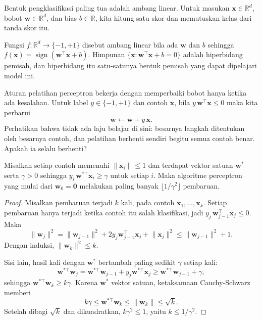 Bentuk pengklasifikasi paling tua adalah ambang linear. Untuk masukan
$\mathbf{x}\in\mathbb{R}^{d}$, bobot $\mathbf{w}\in\mathbb{R}^{d}$, dan bias
$b\in\mathbb{R}$, kita hitung satu skor dan memutuskan kelas dari tanda skor itu.


\begin{definisi}
Fungsi $f:\mathbb{R}^{d}\to\{-1,+1\}$ disebut ambang linear bila ada $\mathbf{w}$ dan $b$
sehingga $f(\mathbf{x})=\operatorname{sign}(\mathbf{w}^{\top}\mathbf{x}+b)$. Himpunan
$\{\mathbf{x}:\mathbf{w}^{\top}\mathbf{x}+b=0\}$ adalah hiperbidang pemisah, dan hiperbidang
itu satu-satunya bentuk pemisah yang dapat dipelajari model ini.
\end{definisi}

Aturan pelatihan perceptron bekerja dengan memperbaiki bobot hanya ketika ada kesalahan.
Untuk label $y\in\{-1,+1\}$ dan contoh $\mathbf{x}$, bila
$y\,\mathbf{w}^{\top}\mathbf{x}\le 0$ maka kita perbarui
\[
  \mathbf{w}\leftarrow\mathbf{w}+y\,\mathbf{x}.
\]
Perhatikan bahwa tidak ada laju belajar di sini: besarnya langkah ditentukan oleh besarnya
contoh, dan pelatihan berhenti sendiri begitu semua contoh benar. Apakah ia selalu berhenti?

\begin{teorema}
Misalkan setiap contoh memenuhi $\lVert\mathbf{x}_{i}\rVert\le1$ dan terdapat vektor satuan
$\mathbf{w}^{*}$ serta $\gamma>0$ sehingga $y_{i}\,\mathbf{w}^{*\top}\mathbf{x}_{i}\ge\gamma$
untuk setiap $i$. Maka algoritme perceptron yang mulai dari $\mathbf{w}_{0}=\mathbf{0}$
melakukan paling banyak $\lfloor1/\gamma^{2}\rfloor$ pembaruan.
\end{teorema}

\begin{proof}
Misalkan pembaruan terjadi $k$ kali, pada contoh $\mathbf{x}_{1},\dots,\mathbf{x}_{k}$.
Setiap pembaruan hanya terjadi ketika contoh itu salah klasifikasi, jadi
$y_{j}\,\mathbf{w}_{j-1}^{\top}\mathbf{x}_{j}\le0$. Maka
\[
  \lVert\mathbf{w}_{j}\rVert^{2}
  =\lVert\mathbf{w}_{j-1}\rVert^{2}+2y_{j}\mathbf{w}_{j-1}^{\top}\mathbf{x}_{j}
   +\lVert\mathbf{x}_{j}\rVert^{2}
  \le\lVert\mathbf{w}_{j-1}\rVert^{2}+1 .
\]
Dengan induksi, $\lVert\mathbf{w}_{k}\rVert^{2}\le k$.

Sisi lain, hasil kali dengan $\mathbf{w}^{*}$ bertambah paling sedikit $\gamma$ setiap kali:
\[
  \mathbf{w}^{*\top}\mathbf{w}_{j}
  =\mathbf{w}^{*\top}\mathbf{w}_{j-1}+y_{j}\mathbf{w}^{*\top}\mathbf{x}_{j}
  \ge\mathbf{w}^{*\top}\mathbf{w}_{j-1}+\gamma ,
\]
sehingga $\mathbf{w}^{*\top}\mathbf{w}_{k}\ge k\gamma$. Karena $\mathbf{w}^{*}$ vektor
satuan, ketaksamaan Cauchy-Schwarz memberi
\[
  k\gamma\le\mathbf{w}^{*\top}\mathbf{w}_{k}\le\lVert\mathbf{w}_{k}\rVert\le\sqrt{k}.
\]
Setelah dibagi $\sqrt{k}$ dan dikuadratkan, $k\gamma^{2}\le1$, yaitu
$k\le1/\gamma^{2}$.
\end{proof}

